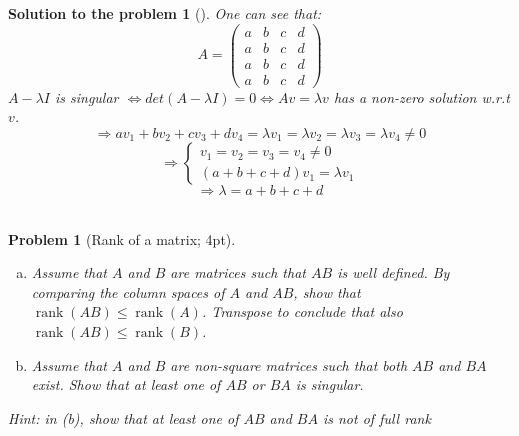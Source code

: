 \documentclass[12pt,a4]{article}
\newtheorem{problem}{Problem}
\newtheorem{solution}{Solution to the problem}
\newcommand\rank{\operatorname{rank}}
\begin{document}
\begin{solution}[]\rm
One can see that:
\[
	A = \begin{pmatrix}
	a  & b & c & d \\  a & b & c & d  
	\\ a & b & c & d \\ a & b & c & d
	\end{pmatrix}
\]
$A - \lambda I$ is singular $\Leftrightarrow det(A - \lambda I) = 0 \Leftrightarrow Av = \lambda v$ has a non-zero solution w.r.t $v$.
\[  \Rightarrow
av_1 + bv_2 + cv_3 + dv_4 = \lambda v_1 = \lambda v_2 = \lambda v_3 = \lambda v_4 \neq 0
\]
\[  \Rightarrow
\left\{\begin{matrix}
v_1 = v_2 = v_3 = v_4 \neq 0  \\ 
(a + b + c + d)v_1 = \lambda v_1 
\end{matrix}\right.
 \]
\[  \Rightarrow
 \lambda = a + b + c + d
\]
\\\end{solution}


\begin{problem}[Rank of a matrix; 4pt] \rm \begin{enumerate}[(a)]
		\item Assume that $A$ and $B$ are matrices such that $AB$ is well defined. By comparing the column spaces of $A$ and $AB$, show that $\rank(AB)\le\rank(A)$. Transpose to conclude that also $\rank(AB)\le\rank(B)$.
		\item Assume that $A$ and $B$ are non-square matrices such that both $AB$ and $BA$ exist. Show that at least one of $AB$ or $BA$ is singular. 
	\end{enumerate}
	\small{\textsf{Hint: in (b), show that at least one of $AB$ and $BA$ is not of full rank}}
\end{problem}	
\end{document}
